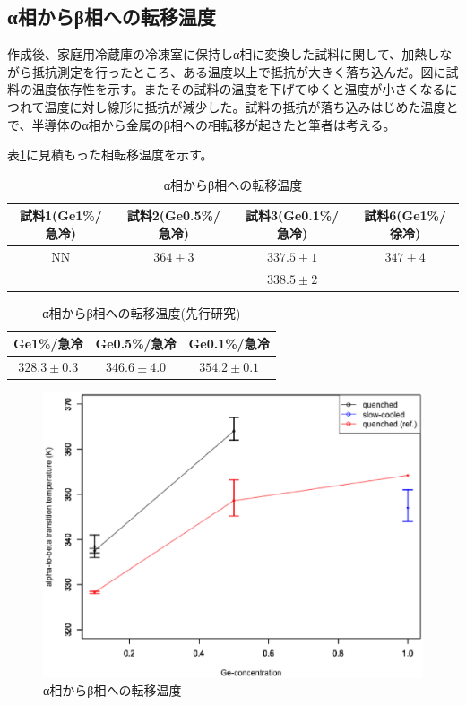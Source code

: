 \subsection{α相からβ相への転移温度}
作成後、家庭用冷蔵庫の冷凍室に保持しα相に変換した試料に関して、加熱しながら抵抗測定を行ったところ、ある温度以上で抵抗が大きく落ち込んだ。図に試料の温度依存性を示す。またその試料の温度を下げてゆくと温度が小さくなるにつれて温度に対し線形に抵抗が減少した。試料の抵抗が落ち込みはじめた温度とで、半導体のα相から金属のβ相への相転移が起きたと筆者は考える。

表\ref{tab:transT}に見積もった相転移温度を示す。
\begin{table}[htb]
  \begin{center}
  \begin{tabular}{cccc}
    試料1(Ge1\%/急冷) & 試料2(Ge0.5\%/急冷) & 試料3(Ge0.1\%/急冷)& 試料6(Ge1\%/徐冷) \\ \hline
    NN & $364\pm3$ & $337.5\pm1$ & $347\pm4$ \\
     &                & $338.5\pm2$ &                \\
  \end{tabular}
  \caption{α相からβ相への転移温度}
  \label{tab:transT}
    \end{center}
\end{table}

\begin{table}[htb]
    \begin{center}
  \begin{tabular}{ccc}
    Ge1\%/急冷 & Ge0.5\%/急冷 & Ge0.1\%/急冷  \\ \hline
    $328.3\pm0.3$ & $346.6\pm4.0$ & $354.2\pm0.1$ \\
  \end{tabular}
  \caption{α相からβ相への転移温度(先行研究\cite{})}
  \label{tab:transT_ref}
    \end{center}
\end{table}

\begin{figure}[htb]
    \begin{center}
   \includegraphics[width=130mm]{results_discussions/TransitionT.eps}
  \end{center}
  \caption{α相からβ相への転移温度}
  \label{fig:TransitionT}
\end{figure}

